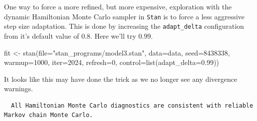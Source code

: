 \documentclass[
  letterpaper,
  DIV=11,
  numbers=noendperiod]{scrartcl}
\newenvironment{Shaded}{\begin{snugshade}}{\end{snugshade}}
\newcommand{\AttributeTok}[1]{\textcolor[rgb]{0.40,0.45,0.13}{#1}}
\newcommand{\DecValTok}[1]{\textcolor[rgb]{0.68,0.00,0.00}{#1}}
\newcommand{\FloatTok}[1]{\textcolor[rgb]{0.68,0.00,0.00}{#1}}
\newcommand{\FunctionTok}[1]{\textcolor[rgb]{0.28,0.35,0.67}{#1}}
\newcommand{\NormalTok}[1]{\textcolor[rgb]{0.00,0.23,0.31}{#1}}
\newcommand{\OtherTok}[1]{\textcolor[rgb]{0.00,0.23,0.31}{#1}}
\newcommand{\SpecialCharTok}[1]{\textcolor[rgb]{0.37,0.37,0.37}{#1}}
\newcommand{\StringTok}[1]{\textcolor[rgb]{0.13,0.47,0.30}{#1}}
\begin{document}
One way to force a more refined, but more expensive, exploration with
the dynamic Hamiltonian Monte Carlo sampler in \texttt{Stan} is to force
a less aggressive step size adaptation. This is done by increasing the
\texttt{adapt\_delta} configuration from it's default value of \(0.8\).
Here we'll try \(0.99\).

\begin{Shaded}
\begin{Highlighting}[]
\NormalTok{fit }\OtherTok{\textless{}{-}} \FunctionTok{stan}\NormalTok{(}\AttributeTok{file=}\StringTok{"stan\_programs/model3.stan"}\NormalTok{,}
            \AttributeTok{data=}\NormalTok{data, }\AttributeTok{seed=}\DecValTok{8438338}\NormalTok{,}
            \AttributeTok{warmup=}\DecValTok{1000}\NormalTok{, }\AttributeTok{iter=}\DecValTok{2024}\NormalTok{, }\AttributeTok{refresh=}\DecValTok{0}\NormalTok{,}
            \AttributeTok{control=}\FunctionTok{list}\NormalTok{(}\StringTok{\textquotesingle{}adapt\_delta\textquotesingle{}}\OtherTok{=}\FloatTok{0.99}\NormalTok{))}
\end{Highlighting}
\end{Shaded}

It looks like this may have done the trick as we no longer see any
divergence warnings.

\begin{Shaded}
\end{Shaded}

\begin{verbatim}
  All Hamiltonian Monte Carlo diagnostics are consistent with reliable
Markov chain Monte Carlo.
\end{verbatim}

\begin{Shaded}
\end{Shaded}
\end{document}

